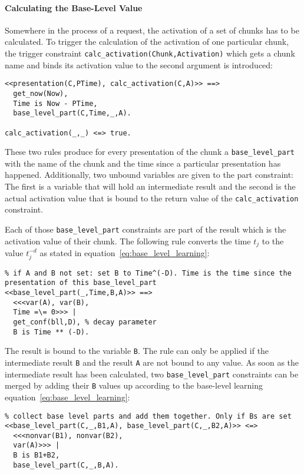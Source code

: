 \paragraph{Calculating the Base-Level Value}

Somewhere in the process of a request, the activation of a set of chunks has to be calculated. To trigger the calculation of the activation of one particular chunk, the trigger constraint \lstinline|calc_activation(Chunk,Activation)| which gets a chunk name and binds its activation value to the second argument is introduced:

\begin{lstlisting}
<<presentation(C,PTime), calc_activation(C,A)>> ==> 
  get_now(Now), 
  Time is Now - PTime, 
  base_level_part(C,Time,_,A).
  
calc_activation(_,_) <=> true.
\end{lstlisting}

These two rules produce for every presentation of the chunk a \lstinline|base_level_part| with the name of the chunk and the time since a particular presentation has happened. Additionally, two unbound variables are given to the part constraint: The first is a variable that will hold an intermediate result and the second is the actual activation value that is bound to the return value of the \lstinline|calc_activation| constraint.

Each of those \lstinline|base_level_part| constraints are part of the result which is the activation value of their chunk. The following rule converts the time $t_j$ to the value $t_j^{-d}$ as stated in equation~\eqref{eq:base_level_learning}:

\begin{lstlisting}
% if A and B not set: set B to Time^(-D). Time is the time since the presentation of this base_level_part
<<base_level_part(_,Time,B,A)>> ==>
  <<<var(A), var(B), 
  Time =\= 0>>> |
  get_conf(bll,D), % decay parameter
  B is Time ** (-D).
\end{lstlisting}

The result is bound to the variable \lstinline|B|. The rule can only be applied if the intermediate result \lstinline|B| and the result \lstinline|A| are not bound to any value. As soon as the intermediate result has been calculated, two \lstinline|base_level_part| constraints can be merged by adding their \lstinline|B| values up according to the base-level learning equation~\eqref{eq:base_level_learning}:

\begin{lstlisting}
% collect base level parts and add them together. Only if Bs are set
<<base_level_part(C,_,B1,A), base_level_part(C,_,B2,A)>> <=>
  <<<nonvar(B1), nonvar(B2), 
  var(A)>>> |
  B is B1+B2,
  base_level_part(C,_,B,A).
\end{lstlisting}

